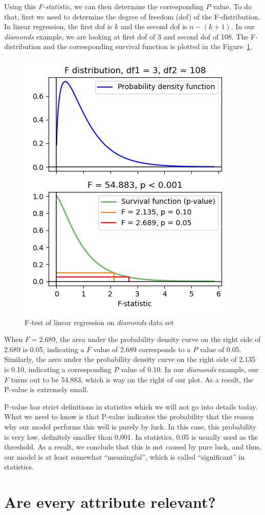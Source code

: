 \documentclass[
	letterpaper
]{article}
\begin{document}
Using this \textit{F-statistic}, we can then determine the corresponding $P$ value.
To do that, first we need to determine the degree of freedom (dof) of the F-distribution.
In linear regression, the first dof is $k$ and the second dof is $n - (k+1)$.
In our \textit{diamonds} example, we are looking at first dof of 3 and second dof of 108.
The F-distribution and the corresponding survival function is plotted in the Figure~\ref{fig:f-test}.
\begin{figure}[htbp]
	\centering
	\includegraphics[width=3.2 in]{figures/f-test.png}
	\caption{F-test of linear regression on \textit{diamonds} data set}
	\label{fig:f-test}
\end{figure}

When $F=2.689$, the area under the probability density curve on the right side of 2.689 is 0.05, indicating a $F$ value of 2.689 corresponds to a $P$ value of 0.05.
Similarly, the area under the probability density curve on the right side of 2.135 is 0.10, indicating a corresponding $P$ value of 0.10.
In our \textit{diamonds} example, our $F$ turns out to be 54.883, which is way on the right of our plot.
As a result, the P-value is extremely small.

P-value has strict definitions in statistics which we will not go into details today.
What we need to know is that P-value indicates the probability that the reason why our model performs this well is purely by luck.
In this case, this probability is very low, definitely smaller than 0.001.
In statistics, 0.05 is usually used as the threshold.
As a result, we conclude that this is not caused by pure luck, and thus, our model is at least somewhat ``meaningful'', which is called ``significant'' in statistics.

\section{Are every attribute relevant?}
\end{document}
